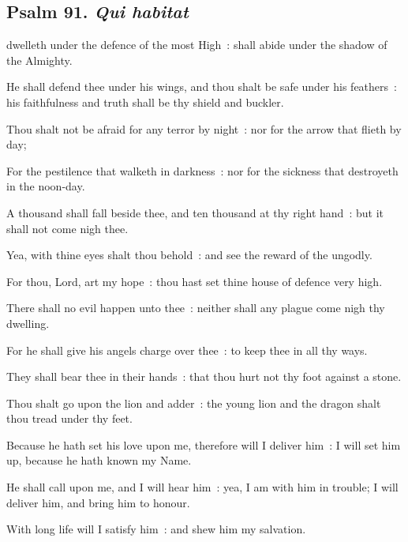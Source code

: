 \subsection{Psalm 91. \textit{Qui habitat}}

 dwelleth under the defence of the most High~: shall abide under the shadow of the Almighty.\par
{}
He shall defend thee under his wings, and thou shalt be safe under his feathers~: his faithfulness and truth shall be thy shield and buckler.\par
{}Thou shalt not be afraid for any terror by night~: nor for the arrow that flieth by day;\par
{}For the pestilence that walketh in darkness~: nor for the sickness that destroyeth in the noon-day.\par
{}A thousand shall fall beside thee, and ten thousand at thy right hand~: but it shall not come nigh thee.\par
{}Yea, with thine eyes shalt thou behold~: and see the reward of the ungodly.\par
{}For thou, Lord, art my hope~: thou hast set thine house of defence very high.\par
{}There shall no evil happen unto thee~: neither shall any plague come nigh thy dwelling.\par
{}For he shall give his angels charge over thee~: to keep thee in all thy ways.\par
{}They shall bear thee in their hands~: that thou hurt not thy foot against a stone.\par
{}Thou shalt go upon the lion and adder~: the young lion and the dragon shalt thou tread under thy feet.\par
{}Because he hath set his love upon me, therefore will I deliver him~: I will set him up, because he hath known my Name.\par
{}He shall call upon me, and I will hear him~: yea, I am with him in trouble; I will deliver him, and bring him to honour.\par
{}With long life will I satisfy him~: and shew him my salvation.\par

